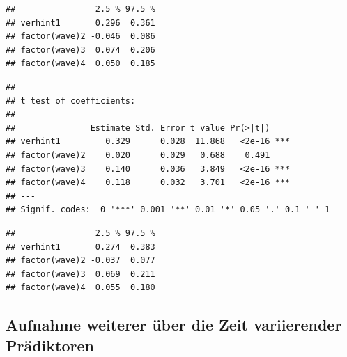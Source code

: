\documentclass[
]{book}
\newenvironment{Shaded}{\begin{snugshade}}{\end{snugshade}}
\newcommand{\CommentTok}[1]{\textcolor[rgb]{0.56,0.35,0.01}{\textit{#1}}}
\newcommand{\DataTypeTok}[1]{\textcolor[rgb]{0.13,0.29,0.53}{#1}}
\newcommand{\DecValTok}[1]{\textcolor[rgb]{0.00,0.00,0.81}{#1}}
\newcommand{\KeywordTok}[1]{\textcolor[rgb]{0.13,0.29,0.53}{\textbf{#1}}}
\newcommand{\NormalTok}[1]{#1}
\newcommand{\OperatorTok}[1]{\textcolor[rgb]{0.81,0.36,0.00}{\textbf{#1}}}
\newcommand{\StringTok}[1]{\textcolor[rgb]{0.31,0.60,0.02}{#1}}
\begin{document}
\begin{verbatim}
##                2.5 % 97.5 %
## verhint1       0.296  0.361
## factor(wave)2 -0.046  0.086
## factor(wave)3  0.074  0.206
## factor(wave)4  0.050  0.185
\end{verbatim}

\begin{Shaded}
\end{Shaded}

\begin{verbatim}
## 
## t test of coefficients:
## 
##               Estimate Std. Error t value Pr(>|t|)    
## verhint1         0.329      0.028  11.868   <2e-16 ***
## factor(wave)2    0.020      0.029   0.688    0.491    
## factor(wave)3    0.140      0.036   3.849   <2e-16 ***
## factor(wave)4    0.118      0.032   3.701   <2e-16 ***
## ---
## Signif. codes:  0 '***' 0.001 '**' 0.01 '*' 0.05 '.' 0.1 ' ' 1
\end{verbatim}

\begin{Shaded}
\end{Shaded}

\begin{verbatim}
##                2.5 % 97.5 %
## verhint1       0.274  0.383
## factor(wave)2 -0.037  0.077
## factor(wave)3  0.069  0.211
## factor(wave)4  0.055  0.180
\end{verbatim}

\hypertarget{aufnahme-weiterer-uxfcber-die-zeit-variierender-pruxe4diktoren}{%
\subsection*{Aufnahme weiterer über die Zeit variierender Prädiktoren}\label{aufnahme-weiterer-uxfcber-die-zeit-variierender-pruxe4diktoren}}
\end{document}
